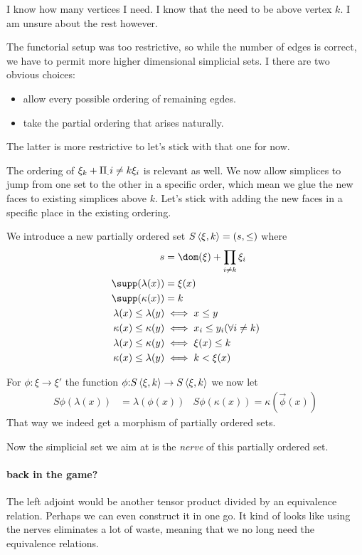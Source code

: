 \documentclass[csh.tex]{subfiles}
\begin{document}
I know how many vertices I need. I know that the need to be above vertex $k$. I am unsure about the rest however.

The functorial setup was too restrictive, so while the number of edges is correct, we have to permit more higher dimensional simplicial sets.
I there are two obvious choices:
\begin{itemize}
\item allow every possible ordering of remaining egdes.
\item take the partial ordering that arises naturally.
\end{itemize}
The latter is more restrictive to let's stick with that one for now.

The ordering of $\xi_k + \Pi _ .{i\neq k}\xi_i$ is relevant as well.
We now allow simplices to jump from one set to the other in a specific order, which mean we glue the new faces to existing simplices above $k$.
Let's stick with adding the new faces in a specific place in the existing ordering.

We introduce a new partially ordered set $S\left\langle \xi,k \right\rangle = (s,\leq)$ where
\begin{align*}
s &= \dom(\xi) + \prod_{i\neq k} \xi_i\\
\supp(\lambda(x)) &= \xi(x) \\
\supp(\kappa(x)) &= k\\
\lambda(x) \leq \lambda(y) &\iff x\leq y \\
\kappa(x) \leq \kappa(y) &\iff x_i\leq y_i (\forall i\neq k)\\
\lambda(x)\leq \kappa(y) &\iff \xi(x) \leq k \\
\kappa(x) \leq \lambda(y) &\iff k < \xi(x)
\end{align*}

For $\phi:\xi\to \xi'$ the function $\phi\mathord : S\left\langle \xi,k \right\rangle \to S\left\langle \xi,k \right\rangle$ we now let
\begin{align*} S\phi(\lambda(x)) &= \lambda(\phi(x)) & S\phi(\kappa(x)) = \kappa(\vec\phi(x)) \end{align*}
That way we indeed get a morphism of partially ordered sets.

Now the simplicial set we aim at is the \emph{nerve} of this partially ordered set.


\paragraph{back in the game?}

The left adjoint would be another tensor product divided by an equivalence relation. Perhaps we can even construct it in one go.
It kind of looks like using the nerves eliminates a lot of waste, meaning that we no long need the equivalence relations.
\end{document}
